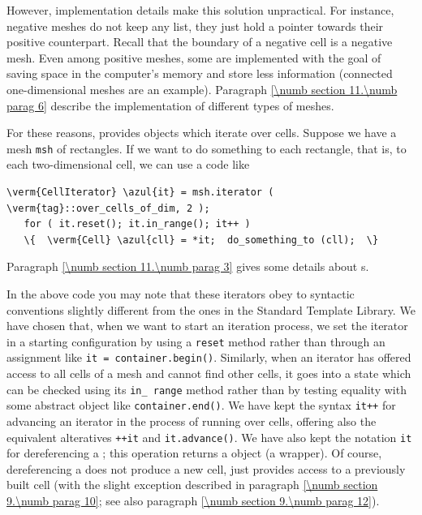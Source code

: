 However, implementation details make this solution unpractical.
For instance, negative meshes do not keep any list,
they just hold a pointer towards their positive counterpart.
Recall that the boundary of a negative cell is a negative mesh.
Even among positive meshes, some are implemented with the goal of saving space in the
computer's memory and store less information (connected one-dimensional meshes are an
example).
Paragraph \ref{\numb section 11.\numb parag 6} describe the implementation of different
types of meshes.

For these reasons, {\maniFEM} provides objects which iterate over cells.
Suppose we have a mesh {\small\tt msh} of rectangles.
If we want to do something to each rectangle, that is, to each two-dimensional cell,
we can use a code like

\begin{Verbatim}[commandchars=\\\{\},formatcom=\small\tt,
   baselinestretch=0.94,framesep=2mm                      ]
   \verm{CellIterator} \azul{it} = msh.iterator ( \verm{tag}::over_cells_of_dim, 2 );
   for ( it.reset(); it.in_range(); it++ )
   \{  \verm{Cell} \azul{cll} = *it;  do_something_to (cll);  \}
\end{Verbatim}

Paragraph \ref{\numb section 11.\numb parag 3} gives some details about {\small\tt{}}s.

In the above code you may note that these iterators obey to syntactic conventions
slightly different from the ones in the Standard Template Library.
We have chosen that, when we want to start an iteration process, we set the iterator in
a starting configuration by using a {\small\tt reset} method rather than through an assignment
like {\small\tt it = container.begin()}.
Similarly, when an iterator has offered access to all cells of a mesh and cannot find
other cells, it goes into a state which can be checked using its {\small\tt in\_\,range} method
rather than by testing equality with some abstract object like {\small\tt container.end()}.
We have kept the syntax {\small\tt it++} for advancing an iterator in the process of
running over cells, offering also the equivalent alteratives {\small\tt ++it} and
{\small\tt it.advance()}.
We have also kept the notation {\small\tt *it} for dereferencing a
{\small\tt {}};
this operation returns a {\small\tt {}} object (a wrapper).
Of course, dereferencing a {\small\tt {}} does not produce a new cell,
just provides access to a previously built cell
(with the slight exception described in paragraph \ref{\numb section 9.\numb parag 10};
see also paragraph \ref{\numb section 9.\numb parag 12}).


